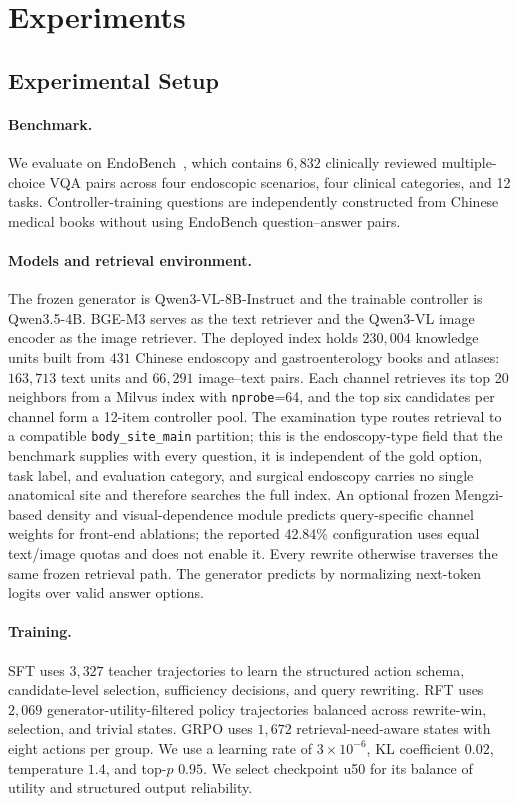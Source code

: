 \section{Experiments}
\label{sec:experiments}

\subsection{Experimental Setup}
\label{sec:setup}

\paragraph{Benchmark.}
We evaluate on EndoBench~\cite{liu2025endobench}, which contains $6{,}832$
clinically reviewed multiple-choice VQA pairs across four endoscopic scenarios,
four clinical categories, and 12 tasks. Controller-training questions are
independently constructed from Chinese medical books without using EndoBench
question--answer pairs.

\paragraph{Models and retrieval environment.}
The frozen generator is Qwen3-VL-8B-Instruct and the trainable controller is
Qwen3.5-4B. BGE-M3 serves as the text retriever and the Qwen3-VL image encoder
as the image retriever. The deployed index holds $230{,}004$ knowledge units
built from $431$ Chinese endoscopy and gastroenterology books and atlases:
$163{,}713$ text units and $66{,}291$ image--text pairs. Each channel retrieves
its top 20 neighbors from a Milvus index with \texttt{nprobe}=64, and the top
six candidates per channel form a 12-item controller pool. The examination
type routes retrieval to a compatible \texttt{body\_site\_main} partition; this
is the endoscopy-type field that the benchmark supplies with every question, it
is independent of the gold option, task label, and evaluation category, and
surgical endoscopy carries no single anatomical site and therefore searches the
full index. An optional frozen Mengzi-based density and visual-dependence
module predicts query-specific channel weights for front-end ablations; the
reported 42.84\% configuration uses equal text/image quotas and does not enable
it. Every rewrite otherwise traverses the same frozen retrieval path. The
generator predicts by normalizing next-token logits over valid answer options.

\paragraph{Training.}
SFT uses $3{,}327$ teacher trajectories to learn the structured action schema,
candidate-level selection, sufficiency decisions, and query rewriting. RFT uses
$2{,}069$ generator-utility-filtered policy trajectories balanced across
rewrite-win, selection, and trivial states. GRPO uses $1{,}672$
retrieval-need-aware states with eight actions per group. We use a learning rate
of $3\times10^{-6}$, KL coefficient $0.02$, temperature $1.4$, and top-$p$
$0.95$. We select checkpoint u50 for its balance of utility and structured
output reliability.


